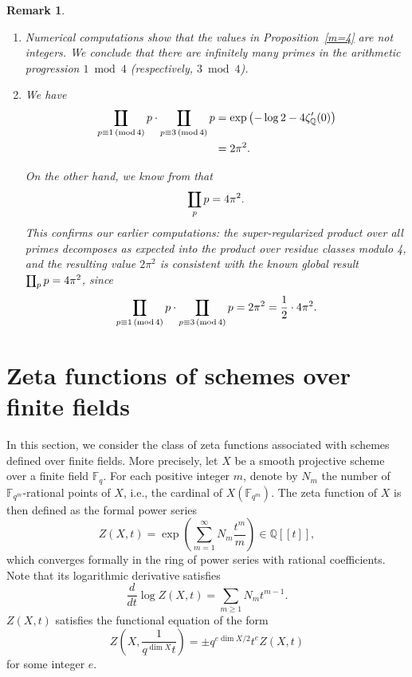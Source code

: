 \documentclass[12pt]{amsart}
\DeclareMathOperator*\Rprod{%
\mathchoice
  {\ooalign{$\displaystyle\prod$\cr\hidewidth$\displaystyle\coprod$\hidewidth\cr}}%
  {\ooalign{$\textstyle\prod$\cr\hidewidth$\textstyle\coprod$\hidewidth\cr}}%
  {\ooalign{$\scriptstyle\prod$\cr\hidewidth$\scriptstyle\coprod$\hidewidth\cr}}%
  {\ooalign{$\scriptscriptstyle\prod$\cr\hidewidth$%
  \scriptscriptstyle\coprod$\hidewidth\cr}}}
\newtheorem{remark}[theorem]{Remark}
\newcommand{\Q}{\mathbb{Q}}
\begin{document}
\begin{remark} 

\item 

\begin{enumerate}

\item  Numerical computations show that the values in Proposition~\ref{m=4} are not integers. We conclude that there are infinitely many primes in the  {arithmetic}  progression $1 \bmod 4$ (respectively, $3 \bmod 4$). 

\item 
We have
\begin{equation*}
\begin{split}
\Rprod_{p \equiv 1 \, (\mathrm{mod}\, 4)} p \cdot \Rprod_{p \equiv 3 \, (\mathrm{mod}\, 4)} p
&= \exp\left( -\log 2 - 4 \zeta_\Q'(0) \right) \\
&= 2\pi^2.
\end{split}
\end{equation*}


On the other hand, we know from \cite{Marco_prime} that
\[
\Rprod_{p} p = 4\pi^2.
\]
This confirms our earlier computations: the super-regularized product over all primes decomposes as expected into the product over residue classes modulo 4, and the resulting value $2\pi^2$ is consistent with the known global result $\Rprod_p p = 4\pi^2$, since
\[
\Rprod_{p \equiv 1 \, (\mathrm{mod}\, 4)} p \cdot \Rprod_{p \equiv 3 \, (\mathrm{mod}\, 4)} p = 2\pi^2 = \frac{1}{2} \cdot 4\pi^2.
\]

\end{enumerate}
\end{remark}





\section{Zeta functions of schemes over finite fields}\label{schemefinite}





In this section, we consider the class of zeta functions associated with schemes defined over finite fields. More precisely, let $X$ be a smooth projective scheme over a finite field $\mathbb{F}_q$. For each positive integer $m$, denote by $N_m$ the number of $\mathbb{F}_{q^m}$-rational points of $X$, i.e., the cardinal  of $X(\mathbb{F}_{q^m})$. The {zeta function} of $X$ is then defined as the formal power series
\[
Z(X, t) = \exp\left( \sum_{m=1}^\infty N_m \frac{t^m}{m} \right) \in \mathbb{Q}[[t]],
\]
which converges formally in the ring of power series with rational coefficients. Note that its logarithmic derivative satisfies
\[
\frac{d}{dt} \log Z(X, t) = \sum_{m \geq 1} N_m t^{m-1}.
\]
 $Z(X,t)$ satisfies the functional equation of the form
\[
Z\left(X, \frac{1}{q^{\dim X} t}\right) = \pm q^{e\dim X /2} t^e Z(X,t)
\]
for some integer $e$.\\
\end{document}
